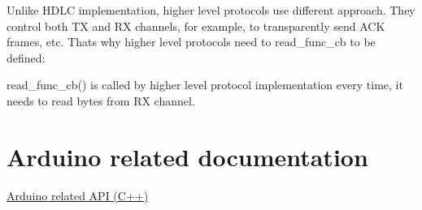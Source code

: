 Unlike H\+D\+LC implementation, higher level protocols use different approach. They control both TX and RX channels, for example, to transparently send A\+CK frames, etc. That\textquotesingle{}s why higher level protocols need to read\+\_\+func\+\_\+cb to be defined\+:


\begin{DoxyItemize}
\item read\+\_\+func\+\_\+cb() is called by higher level protocol implementation every time, it needs to read bytes from RX channel.
\end{DoxyItemize}\hypertarget{index_arduino_section}{}\section{Arduino related documentation}\label{index_arduino_section}
\hyperlink{arduino}{Arduino related A\+PI (C++)} 